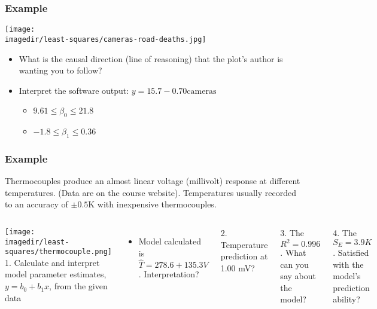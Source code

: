 \begin{frame}\frametitle{Example}
	\begin{center}
		\texttt{[image: \\imagedir/least-squares/cameras-road-deaths.jpg]}
	\end{center}
	\begin{itemize}
		\item	What is the causal direction (line of reasoning) that the plot's author is wanting you to follow?
		\item	Interpret the software output: $y = 15.7 - 0.70 \text{cameras}$
		\begin{itemize}
			\item	$9.61 \leq \beta_0 \leq 21.8$
			\item	$-1.8 \leq \beta_1 \leq 0.36$
		\end{itemize}
	\end{itemize}
\end{frame}

\begin{frame}\frametitle{Example}

	Thermocouples produce an almost linear voltage (millivolt) response at different temperatures. (Data are on the course website). Temperatures usually recorded to an accuracy of $\pm 0.5$K with inexpensive thermocouples.
	\begin{columns}
		\column{5cm}
		\texttt{[image: \\imagedir/least-squares/thermocouple.png]} \column{5cm} 1. Calculate and interpret model parameter estimates, $y = b_0 + b_1 x$, from the given data
		\begin{itemize}
			\item	Model calculated is $\hat{T} = 278.6 + 135.3 V$. Interpretation?
		\end{itemize}

		2. Temperature prediction at 1.00 mV?

		3. The $R^2 = 0.996$. What can you say about the model?

		4. The $S_E = 3.9K$. Satisfied with the model's prediction ability?
	\end{columns}
\end{frame}

